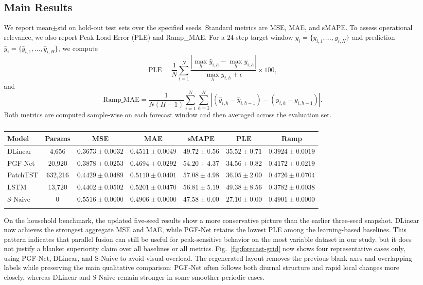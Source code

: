 \documentclass[pdflatex,sn-mathphys-num]{sn-jnl}
\theoremstyle{thmstyleone}
\theoremstyle{thmstyletwo}
\theoremstyle{thmstylethree}
\begin{document}
\subsection{Main Results}

We report mean$\pm$std on hold-out test sets over the specified seeds. Standard metrics are MSE, MAE, and sMAPE.\cite{hyndman2006another,hyndman2009forecast} To assess operational relevance, we also report Peak Load Error (PLE) and Ramp\_MAE. For a $24$-step target window $y_i=\{y_{i,1},\ldots,y_{i,H}\}$ and prediction $\hat{y}_i=\{\hat{y}_{i,1},\ldots,\hat{y}_{i,H}\}$, we compute
\[
\mathrm{PLE}=\frac{1}{N}\sum_{i=1}^{N}\frac{\left|\max_h \hat{y}_{i,h}-\max_h y_{i,h}\right|}{\max_h y_{i,h}+\epsilon}\times 100,
\]
and
\[
\mathrm{Ramp\_MAE}=\frac{1}{N(H-1)}\sum_{i=1}^{N}\sum_{h=2}^{H}\left|(\hat{y}_{i,h}-\hat{y}_{i,h-1})-(y_{i,h}-y_{i,h-1})\right|.
\]
Both metrics are computed sample-wise on each forecast window and then averaged across the evaluation set.

\begin{table}[htbp]
\caption{\CapTabHousehold}
\label{tab:household}
\centering
\fontsize{6.6}{7.6}\selectfont
\setlength{\tabcolsep}{1.5pt}
\begin{tabular}{lcccccc}
\toprule
Model & Params & MSE & MAE & sMAPE & PLE & Ramp \\
\midrule
DLinear & 4,656 & $0.3673\pm0.0032$ & $0.4511\pm0.0049$ & $49.72\pm0.56$ & $35.52\pm0.71$ & $0.3924\pm0.0019$ \\
PGF-Net & 20,920 & $0.3878\pm0.0253$ & $0.4694\pm0.0292$ & $54.20\pm4.37$ & $34.56\pm0.82$ & $0.4172\pm0.0219$ \\
PatchTST & 632,216 & $0.4429\pm0.0489$ & $0.5110\pm0.0401$ & $57.08\pm4.98$ & $36.05\pm2.00$ & $0.4726\pm0.0704$ \\
LSTM & 13,720 & $0.4402\pm0.0502$ & $0.5201\pm0.0470$ & $56.81\pm5.19$ & $49.38\pm8.56$ & $0.3782\pm0.0038$ \\
S-Naive & 0 & $0.5516\pm0.0000$ & $0.4906\pm0.0000$ & $47.58\pm0.00$ & $27.10\pm0.00$ & $0.4901\pm0.0000$ \\
\botrule
\end{tabular}
\normalsize
\end{table}

On the household benchmark, the updated five-seed results show a more conservative picture than the earlier three-seed snapshot. DLinear now achieves the strongest aggregate MSE and MAE, while PGF-Net retains the lowest PLE among the learning-based baselines. This pattern indicates that parallel fusion can still be useful for peak-sensitive behavior on the most variable dataset in our study, but it does not justify a blanket superiority claim over all baselines or all metrics. Fig.~\ref{fig:forecast-grid} now shows four representative cases only, using PGF-Net, DLinear, and S-Naive to avoid visual overload. The regenerated layout removes the previous blank axes and overlapping labels while preserving the main qualitative comparison: PGF-Net often follows both diurnal structure and rapid local changes more closely, whereas DLinear and S-Naive remain stronger in some smoother periodic cases.
\end{document}
